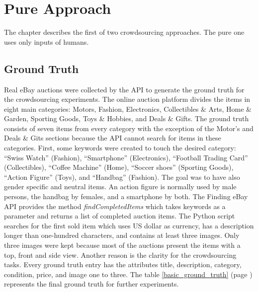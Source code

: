 \section{Pure Approach}
The chapter describes the first of two crowdsourcing approaches. The pure one uses only inputs of humans.
\subsection{Ground Truth}
\label{ground_truth}
Real eBay auctions were collected by the API to generate the ground truth for the crowdsourcing experiments. The online auction platform divides the items in eight main categories: Motors, Fashion, Electronics, Collectibles \& Arts, Home \& Garden, Sporting Goods, Toys \& Hobbies, and Deals \& Gifts. The ground truth consists of seven items from every category with the exception of the Motor's and Deals \& Gits sections because the API cannot search for items in these categories. First, some keywords were created to touch the desired category: ``Swiss Watch'' (Fashion), ``Smartphone'' (Electronics), ``Football Trading Card'' (Collectibles), ``Coffee Machine'' (Home), ``Soccer shoes'' (Sporting Goods), ``Action Figure'' (Toys), and ``Handbag'' (Fashion). The goal was to have also gender specific and neutral items. An action figure is normally used by male persons, the handbag by females, and a smartphone by both. The Finding eBay API provides the method \textit{findCompletedItems} which takes keywords as a parameter and returns a list of completed auction items. The Python script searches for the first sold item which uses US dollar as currency, has a description longer than one-hundred characters, and contains at least three images. Only three images were kept because most of the auctions present the items with a top, front and side view. Another reason is the clarity for the crowdsourcing tasks. Every ground truth entry has the attributes title, description, category, condition, price, and image one to three. The table \ref{basic_ground_truth} (page \pageref{basic_ground_truth}) represents the final ground truth for further experiments.

